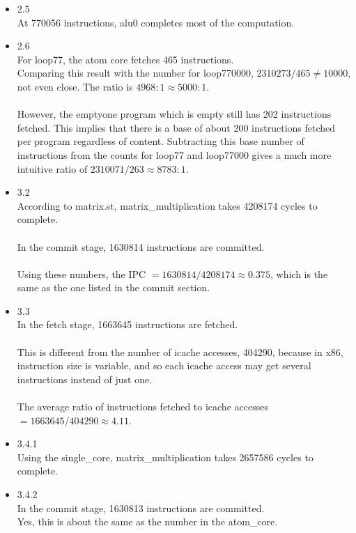 \documentclass[a4paper]{article}
\begin{document}
\begin{itemize}
\item{2.5}\\
At 770056 instructions, alu0 completes most of the computation.


\item{2.6} \\
For loop77, the atom core fetches 465 instructions. \\
Comparing this result with the number for loop770000, $2310273/465 \neq 10000$, not even close. The ratio is $4968:1 \approx 5000:1$. \\
\\
However, the emptyone program which is empty still has 202 instructions fetched. This implies that there is a base of about 200 instructions fetched per program regardless of content. Subtracting this base number of instructions from the counts for loop77 and loop77000 gives a much more intuitive ratio of $2310071/263 \approx 8783:1$.


\item{3.2} \\
According to matrix.st, matrix\_multiplication takes 4208174 cycles to complete. \\
\\
In the commit stage, 1630814 instructions are committed. \\
\\
Using these numbers, the IPC $= 1630814/4208174 \approx 0.375$, which is the same as the one listed in the commit section.


\item{3.3} \\
In the fetch stage, 1663645 instructions are fetched. \\
\\
This is different from the number of icache accesses, 404290, because in x86, instruction size is variable, and so each icache access may get several instructions instead of just one. \\
\\
The average ratio of instructions fetched to icache accesses $= 1663645/404290 \approx 4.11$.


\item{3.4.1} \\
Using the single\_core, matrix\_multiplication takes 2657586 cycles to complete.


\item{3.4.2} \\
In the commit stage, 1630813 instructions are committed. \\
Yes, this is about the same as the number in the atom\_core.



\end{itemize}
\end{document}
